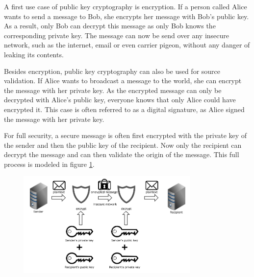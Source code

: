 A first use case of public key cryptography is encryption. If a person called Alice wants to send a message to Bob, she encrypts her message with Bob's public key. As a result, only Bob  can decrypt this message as only Bob knows the corresponding private key. The message can now be send over any insecure network, such as the internet, email or even carrier pigeon, without any danger of leaking its contents.

Besides encryption, public key cryptography can also be used for source validation. If Alice wants to broadcast a message to the world, she can encrypt the message with her private key. As the encrypted message can only be decrypted with Alice's public key, everyone knows that only Alice could have encrypted it. This case is often referred to as a digital signature, as Alice signed the message with her private key. 

For full security, a secure message is often first encrypted with the private key of the sender and then the public key of the recipient. Now only the recipient can decrypt the message and can then validate the origin of the message. This full process is modeled in figure \ref{fig:rsa-diagram}.

\begin{figure}[h]
\centering
\includegraphics[width=0.8\textwidth]{paper-images/rsa-diagram.png}
\caption{}
\label{fig:rsa-diagram}
\end{figure}


